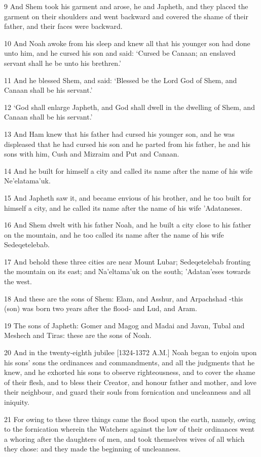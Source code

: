 \par 9 And Shem took his garment and arose, he and Japheth, and they placed the garment on their shoulders and went backward and covered the shame of their father, and their faces were backward.
\par 10 And Noah awoke from his sleep and knew all that his younger son had done unto him, and he cursed his son and said: ‘Cursed be Canaan; an enslaved servant shall he be unto his brethren.’
\par 11 And he blessed Shem, and said: ‘Blessed be the Lord God of Shem, and Canaan shall be his servant.’
\par 12 ‘God shall enlarge Japheth, and God shall dwell in the dwelling of Shem, and Canaan shall be his servant.’
\par 13 And Ham knew that his father had cursed his younger son, and he was displeased that he had cursed his son and he parted from his father, he and his sons with him, Cush and Mizraim and Put and Canaan.
\par 14 And he built for himself a city and called its name after the name of his wife Ne'elatama'uk.
\par 15 And Japheth saw it, and became envious of his brother, and he too built for himself a city, and he called its name after the name of his wife 'Adataneses.
\par 16 And Shem dwelt with his father Noah, and he built a city close to his father on the mountain, and he too called its name after the name of his wife Sedeqetelebab.
\par 17 And behold these three cities are near Mount Lubar; Sedeqetelebab fronting the mountain on its east; and Na'eltama'uk on the south; 'Adatan'eses towards the west.
\par 18 And these are the sons of Shem: Elam, and Asshur, and Arpachshad -this (son) was born two years after the flood- and Lud, and Aram.
\par 19 The sons of Japheth: Gomer and Magog and Madai and Javan, Tubal and Meshech and Tiras: these are the sons of Noah.
\par 20 And in the twenty-eighth jubilee [1324-1372 A.M.] Noah began to enjoin upon his sons' sons the ordinances and commandments, and all the judgments that he knew, and he exhorted his sons to observe righteousness, and to cover the shame of their flesh, and to bless their Creator, and honour father and mother, and love their neighbour, and guard their souls from fornication and uncleanness and all iniquity.
\par 21 For owing to these three things came the flood upon the earth, namely, owing to the fornication wherein the Watchers against the law of their ordinances went a whoring after the daughters of men, and took themselves wives of all which they chose: and they made the beginning of uncleanness.
